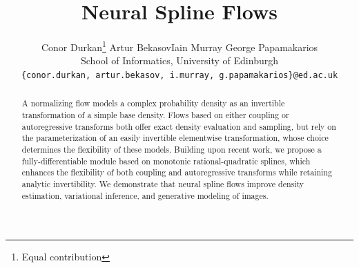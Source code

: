 \documentclass{article}
\title{Neural Spline Flows}
\author{
  Conor Durkan\thanks{Equal contribution} \quad Artur Bekasov\footnotemark[1] \quad Iain Murray \quad George Papamakarios \\
  School of Informatics, 
  University of Edinburgh \\
  \texttt{\{conor.durkan, artur.bekasov, i.murray, g.papamakarios\}@ed.ac.uk}
}
\newif\ifanonymize
\begin{document}
\maketitle

\begin{abstract}
A normalizing flow models a complex probability density as an invertible transformation of a simple base density. 
Flows based on either coupling or autoregressive transforms both offer exact density evaluation and sampling, but rely on the parameterization of an easily invertible elementwise transformation, whose choice determines the flexibility of these models.
Building upon recent work, we propose a fully-differentiable module based on monotonic rational-quadratic splines, which enhances the flexibility of both coupling and autoregressive transforms while retaining analytic invertibility. 
We demonstrate that neural spline flows improve density estimation, variational inference, and generative modeling of images. 
\end{abstract}








\ifanonymize
\else

\fi

\newpage

{\small

}

\newpage
\appendix



\end{document}
